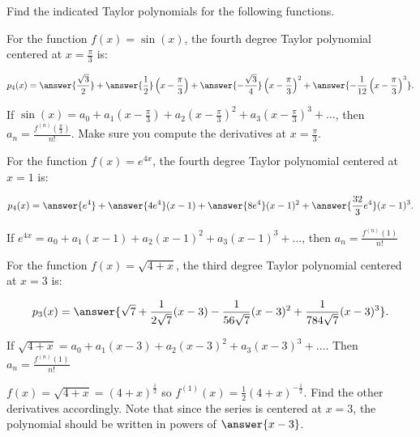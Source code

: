 \documentclass{ximera}
\author{Jim Talamo and Nicholas Hemleben}
\begin{document}
\begin{exercise}
Find the indicated Taylor polynomials for the following functions.

For the function $f(x) = \sin (x)$, the fourth degree Taylor polynomial centered at $x=\frac{\pi}{3}$ is:

\[
p_4(x) =
 \answer{ \frac{\sqrt 3 }{2}}+   \answer{ \frac{1}{2}} \left(x- \frac{\pi}{3}\right) + \answer{- \frac{\sqrt{3}}{4}} \left(x- \frac{\pi}{3}\right)^2 +  \answer{-\frac{1}{12} \left(x- \frac{\pi}{3}\right)^3  }.
 \]

\begin{hint}
If $\sin(x) = a_0 + a_1 \left(x- \frac{\pi}{3}\right) + a_2 \left(x- \frac \pi  3\right)^2 + a_3 \left(x- \frac{\pi}{3}\right)^3 +\ldots $, then $a_n = \frac{f^{(n)} \left(\frac{\pi}{3}\right)}{n!}$.  Make sure you compute the derivatives at $x = \frac{\pi}{3}$.
\end{hint}

\end{exercise}

\begin{exercise}
For the function $f(x) = e^{4x}$, the fourth degree Taylor polynomial centered at $x=1$ is:

\[ 
p_4(x) =
 \answer{e^4}+ \answer{4e^4} (x-1) + \answer{ 8 e^4} (x- 1)^2 +  \answer{ \frac{32}{3} e^4} (x- 1)^3.
 \]
    
\begin{hint}
If $e^{4x} = a_0 + a_1 (x- 1 ) + a_2 (x- 1 )^2 + a_3 (x- 1)^3 +\ldots $, then $a_n = \frac{f^{(n)} (1)} {n!}$
\end{hint}

\end{exercise}

\begin{exercise}
For the function $f(x) =\sqrt{4+x}$, the third degree Taylor polynomial centered at $x=3$ is:

\[
p_3(x) = \answer{\sqrt{7}+ \frac{1}{2 \sqrt{7}} (x-3) - \frac{1}{56 \sqrt{7}} (x- 3)^2 + \frac{1}{784 \sqrt{7}} (x- 3)^3 }  .
\]
     
\begin{hint}
If $\sqrt{4+x} = a_0 + a_1 (x- 3 ) + a_2 (x- 3 )^2 + a_3 (x- 3)^3 +\ldots $.
Then $a_n = \frac{f^{(n)} (1)} {n!}$
\end{hint}

\begin{hint}
$f(x) =  \sqrt{4+x}= (4+x)^{\frac{1} {2}} $ so $f^{(1)} (x) = \frac{1}{2} (4+x)^{- \frac{1} {2}} $.  Find the other derivatives accordingly.  Note that since the series is centered at $x=3$, the polynomial should be written in powers of $\answer{x-3}$. 
\end{hint}
\end{exercise}
\end{document}
